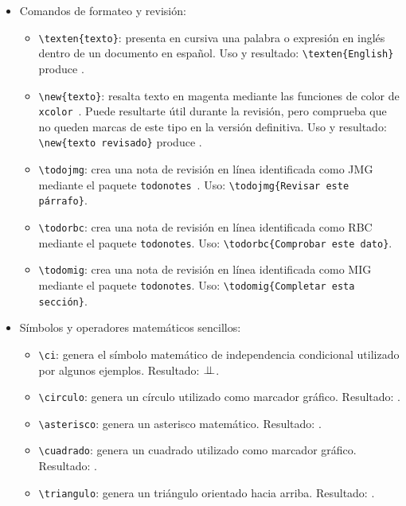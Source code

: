 \begin{itemize}
  \item Comandos de formateo y revisión:
  \begin{itemize}
    \item \texttt{\textbackslash{}texten\{texto\}}: presenta en cursiva una palabra o expresión en inglés dentro de un documento en español. Uso y resultado: \texttt{\textbackslash{}texten\{English\}} produce .
    \item \texttt{\textbackslash{}new\{texto\}}: resalta texto en magenta mediante las funciones de color de \texttt{xcolor}~\cite{xcolor-manual}. Puede resultarte útil durante la revisión, pero comprueba que no queden marcas de este tipo en la versión definitiva. Uso y resultado: \texttt{\textbackslash{}new\{texto revisado\}} produce .
    \item \texttt{\textbackslash{}todojmg}: crea una nota de revisión en línea identificada como JMG mediante el paquete \texttt{todonotes}~\cite{todonotes-manual}. Uso: \texttt{\textbackslash{}todojmg\{Revisar este párrafo\}}.
    \item \texttt{\textbackslash{}todorbc}: crea una nota de revisión en línea identificada como RBC mediante el paquete \texttt{todonotes}. Uso: \texttt{\textbackslash{}todorbc\{Comprobar este dato\}}.
    \item \texttt{\textbackslash{}todomig}: crea una nota de revisión en línea identificada como MIG mediante el paquete \texttt{todonotes}. Uso: \texttt{\textbackslash{}todomig\{Completar esta sección\}}.
  \end{itemize}
  \item Símbolos y operadores matemáticos sencillos:
  \begin{itemize}
    \item \texttt{\textbackslash{}ci}: genera el símbolo matemático de independencia condicional utilizado por algunos ejemplos. Resultado: \(\perp\!\!\!\perp\).
    \item \texttt{\textbackslash{}circulo}: genera un círculo utilizado como marcador gráfico. Resultado: {\circulo}.
    \item \texttt{\textbackslash{}asterisco}: genera un asterisco matemático. Resultado: {\asterisco}.
    \item \texttt{\textbackslash{}cuadrado}: genera un cuadrado utilizado como marcador gráfico. Resultado: {\cuadrado}.
    \item \texttt{\textbackslash{}triangulo}: genera un triángulo orientado hacia arriba. Resultado: {\triangulo}.

\end{itemize}
\end{itemize}

